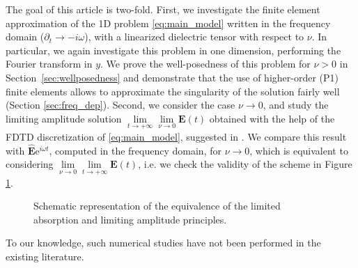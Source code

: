 The goal of this article is two-fold. 
First, we investigate the finite element approximation of the 1D 
problem \eqref{eq:main_model} written in the frequency domain ($\partial_t\rightarrow -i\omega$), with a linearized dielectric tensor with respect to $\nu$.
In particular, we again investigate this problem in one dimension, performing the Fourier transform in $y$.
We prove the well-posedness of this problem for $\nu>0$ in Section~\ref{sec:wellposedness} and 
demonstrate that the use of higher-order (P1) finite elements allows to approximate the singularity 
of the solution fairly well (Section \ref{sec:freq_dep}). 
Second, we consider the case $\nu\rightarrow 0$, and study the limiting amplitude solution 
$\lim\limits_{t\rightarrow +\infty}\lim\limits_{\nu\rightarrow 0}\mathbf{E}(t)$ obtained with the help of 
the FDTD discretization of \eqref{eq:main_model}, suggested in \cite{stable_yee_plasma_current}. 
We compare this result with 
$\hat{\mathbf{E}}\mathrm{e}^{i\omega t}$, computed in the frequency domain, for $\nu\rightarrow 0$, which is equivalent to considering
$\lim\limits_{\nu\rightarrow 0}\lim\limits_{t\rightarrow+\infty}\mathbf{E}(t)$, i.e. we check the validity of the scheme in Figure \ref{fig:limits}. 
\begin{figure}
 \caption{Schematic representation of the equivalence of the limited absorption and limiting amplitude principles.}
 \label{fig:limits}
\end{figure}

To our knowledge, such numerical studies have not been performed in the existing literature. 
